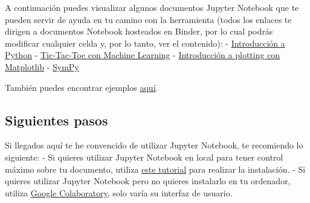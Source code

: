 \documentclass[11pt]{article}
\begin{document}
    A continuación puedes visualizar algunos documentos Jupyter Notebook que
te pueden servir de ayuda en tu camino con la herramienta (todos los
enlaces te dirigen a documentos Notebook hosteados en Binder, por lo
cual podrás modificar cualquier celda y, por lo tanto, ver el
contenido): -
\href{https://mybinder.org/v2/gh/ehmatthes/intro_programming/master?filepath=notebooks/index.ipynb}{Introducción
a Python} -
\href{https://mybinder.org/v2/gh/albertopastormr/tic-tac-toe/master?filepath=\%2FTic-Tac-Toe_UCI.ipynb}{Tic-Tac-Toe
con Machine Learning} -
\href{https://hub.mybinder.org/user/jrjohansson-sci-python-lectures-5byenvty/notebooks/Lecture-4-Matplotlib.ipynb}{Introducción
a plotting con Matplotlib} -
\href{https://hub.mybinder.org/user/ipython-ipython-2f6w2d1v/notebooks/examples/IPython\%20Kernel/SymPy.ipynb}{SymPy}

También puedes encontrar ejemplos
\href{https://jupyter-notebook.readthedocs.io/en/stable/examples/Notebook/examples_index.html}{aquí}.

    \subsection{Siguientes pasos}\label{siguientes-pasos}

    Si llegados aquí te he convencido de utilizar Jupyter Notebook, te
recomiendo lo siguiente: - Si quieres utilizar Jupyter Notebook en local
para tener control máximo sobre tu documento, utiliza
\href{https://jupyter.readthedocs.io/en/latest/install.html}{este
tutorial} para realizar la instalación. - Si quieres utilizar Jupyter
Notebook pero no quieres instalarlo en tu ordenador, utiliza
\href{https://colab.research.google.com}{Google Colaboratory}, solo
varía su interfaz de usuario.


    
    
    
    
\end{document}
